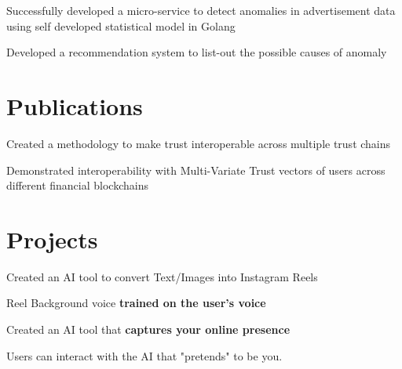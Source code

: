 \documentclass[]{deedy-resume-openfont}
\begin{document}
\begin{minipage}[t]{0.66\textwidth}
{}
\begin{tightemize}
\item Successfully developed a micro-service to detect anomalies in advertisement data using self developed statistical model in Golang
\item Developed a recommendation system to list-out the possible causes of anomaly
\end{tightemize}



\section{Publications}
\begin{tightemize}
\item Created a methodology to make trust interoperable across multiple trust chains
\item Demonstrated interoperability with Multi-Variate Trust vectors of users across different financial blockchains
\end{tightemize}

\section{Projects}
\begin{tightemize}
\item Created an AI tool to convert Text/Images into Instagram Reels \\
\item Reel Background voice \textbf{trained on the user's voice}
\end{tightemize}
\sectionsep

\begin{tightemize}
\item Created an AI tool that \textbf{captures your online presence }\\
\item Users can interact with the AI that "pretends" to be you.
\end{tightemize}
\sectionsep


\end{minipage}
\end{document}

